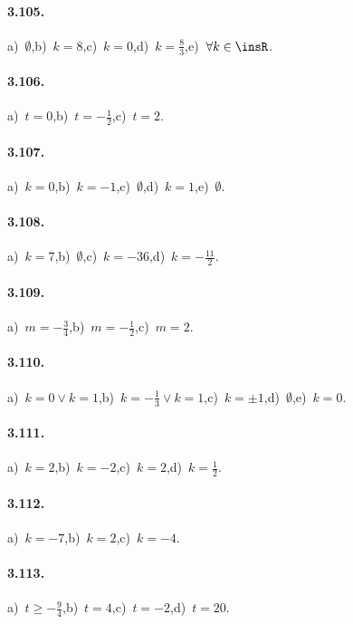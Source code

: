 \paragraph{3.105.} a)~$\emptyset $,\quad b)~$k = 8 $,\quad c)~$ k = 0$,\quad d)~$k = \frac{8}{3} $,\quad e)~$\forall k \in \insR$.

\paragraph{3.106.} a)~$t=0$,\quad b)~$t=-\frac{1}{2}$,\quad c)~$t=2$.

\paragraph{3.107.} a)~$ k = 0 $,\quad b)~$ k =-1 $,\quad c)~$ \emptyset $,\quad d)~$ k = 1 $,\quad e)~$ \emptyset $.

\paragraph{3.108.} a)~$ k = 7 $,\quad b)~$ \emptyset $,\quad c)~$ k =-36 $,\quad d)~$ k =-\frac{11}{2} $.

\paragraph{3.109.} a)~$m=-\frac{3}{4}$,\quad b)~$m=-\frac{1}{2}$,\quad c)~$m=2$.

\paragraph{3.110.} a)~$ k = 0 \vee k = 1 $,\quad b)~$ k =-\frac{1}{3} \vee k = 1 $,\quad c)~$ k = \pm 1 $,\quad d)~$ \emptyset $,\quad e)~$ k=0 $.

\paragraph{3.111.} a)~$ k = 2 $,\quad b)~$ k = -2 $,\quad c)~$ k = 2 $,\quad d)~$ k = \frac{1}{2} $.

\paragraph{3.112.} a)~$k=-7$,\quad b)~$k = 2$,\quad c)~$ k = -4 $.

\paragraph{3.113.} a)~$t\ge-\frac{9}{4}$,\quad b)~$t=4$,\quad c)~$t=-2$,\quad d)~$t=20$.

